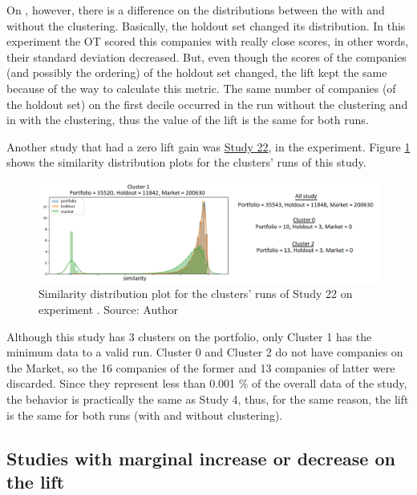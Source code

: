 On \nameExperimentII{}, however, there is a difference on the distributions between the with and without the clustering. Basically, the holdout set changed its distribution. In this experiment the OT scored this companies with really close scores, in other words, their standard deviation decreased. But, even though the scores of the companies (and possibly the ordering) of the holdout set changed, the lift kept the same because of the way to calculate this metric. The same number of companies (of the holdout set) on the first decile occurred in the run without the clustering and in with the clustering, thus the value of the lift is the same for both runs.

Another study that had a zero lift gain was \underline{Study 22}, in the \nameExperimentI{} experiment. Figure \ref{fig:study-22-clusters-simi-plot} shows the similarity distribution plots for the clusters' runs of this study.

\begin{figure}[h]
   \centering
   \includegraphics[width=\linewidth]{fig/ch4-study-22-clusters-simi-plot.png}
   \caption{Similarity distribution plot for the clusters' runs of Study 22 on experiment \nameExperimentI{}. Source: Author}
   \label{fig:study-22-clusters-simi-plot}
\end{figure}

Although this study has 3 clusters on the portfolio, only Cluster 1 has the minimum data to a valid run. Cluster 0 and Cluster 2 do not have companies on the Market, so the 16 companies of the former and 13 companies of latter were discarded. Since they represent less than 0.001 \% of the overall data of the study, the behavior is practically the same as Study 4, thus, for the same reason, the lift is the same for both runs (with and without clustering).

\subsection{Studies with marginal increase or decrease on the lift}
\label{ch:marginal-change}

